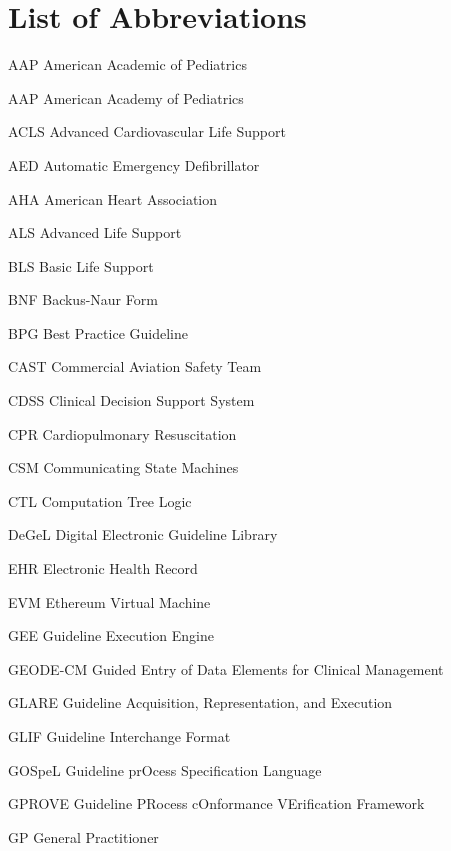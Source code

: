 \documentclass{uiucthesis2021}
\begin{document}
{
    \hypersetup{linkcolor=black}  %
    \tableofcontents
}

\chapter{List of Abbreviations}

\begin{abbrevlist}
\item[AAP]      American Academic of Pediatrics
\item[AAP]      American Academy of Pediatrics
\item[ACLS]     Advanced Cardiovascular Life Support
\item[AED]      Automatic Emergency Defibrillator
\item[AHA]      American Heart Association
\item[ALS]      Advanced Life Support
\item[BLS]      Basic Life Support
\item[BNF]      Backus-Naur Form
\item[BPG]      Best Practice Guideline
\item[CAST]     Commercial Aviation Safety Team
\item[CDSS]     Clinical Decision Support System
\item[CPR]      Cardiopulmonary Resuscitation
\item[CSM]      Communicating State Machines
\item[CTL]      Computation Tree Logic
\item[DeGeL]    Digital Electronic Guideline Library
\item[EHR]      Electronic Health Record
\item[EVM]      Ethereum Virtual Machine
\item[GEE]      Guideline Execution Engine
\item[GEODE-CM] Guided Entry of Data Elements for Clinical Management
\item[GLARE]    Guideline Acquisition, Representation, and Execution
\item[GLIF]     Guideline Interchange Format
\item[GOSpeL]   Guideline prOcess Specification Language
\item[GPROVE]   Guideline PRocess cOnformance VErification Framework
\item[GP]       General Practitioner

\end{abbrevlist}
\end{document}
